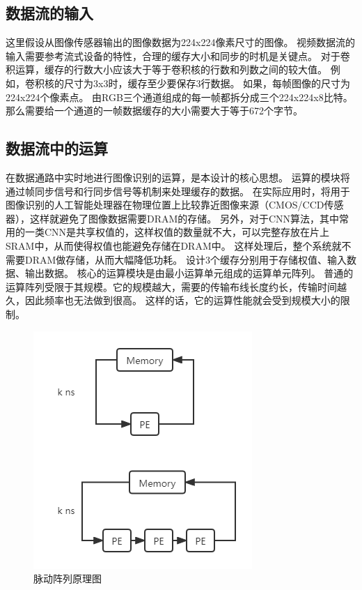 \subsection{数据流的输入}

这里假设从图像传感器输出的图像数据为224x224像素尺寸的图像。
视频数据流的输入需要参考流式设备的特性，合理的缓存大小和同步的时机是关键点。
对于卷积运算，缓存的行数大小应该大于等于卷积核的行数和列数之间的较大值。
例如，卷积核的尺寸为3x3时，缓存至少要保存3行数据。
如果，每帧图像的尺寸为224x224个像素点。
由RGB三个通道组成的每一帧都拆分成三个224x224x8比特。
那么需要给一个通道的一帧数据缓存的大小需要大于等于672个字节。


\subsection{数据流中的运算}

在数据通路中实时地进行图像识别的运算，是本设计的核心思想。
运算的模块将通过帧同步信号和行同步信号等机制来处理缓存的数据。
在实际应用时，将用于图像识别的人工智能处理器在物理位置上比较靠近图像来源（CMOS/CCD传感器），这样就避免了图像数据需要DRAM的存储。
另外，对于CNN算法，其中常用的一类CNN是共享权值的，这样权值的数量就不大，可以完整存放在片上SRAM中，从而使得权值也能避免存储在DRAM中。
这样处理后，整个系统就不需要DRAM做存储，从而大幅降低功耗。
设计3个缓存分别用于存储权值、输入数据、输出数据。
核心的运算模块是由最小运算单元组成的运算单元阵列。
普通的运算阵列受限于其规模。它的规模越大，需要的传输布线长度约长，传输时间越久，因此频率也无法做到很高。
这样的话，它的运算性能就会受到规模大小的限制。  
\begin{figure}[htbp]
    \centering
    \includegraphics[]{figures/systolic_array.png}
    \caption{脉动阵列原理图}
    \label{systolic}
\end{figure}


